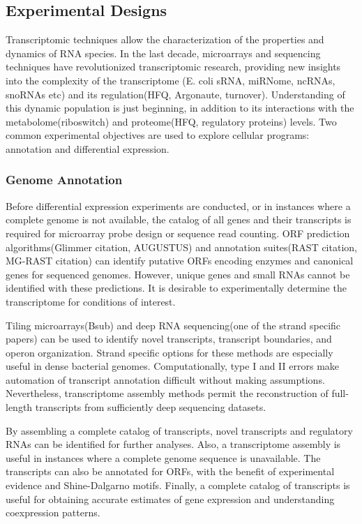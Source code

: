 \subsection{Experimental Designs}
Transcriptomic techniques allow the characterization of the properties and dynamics of RNA species. In the last decade, microarrays and sequencing techniques have revolutionized transcriptomic research, providing new insights into the complexity of the transcriptome (E. coli sRNA, miRNome, ncRNAs, snoRNAs etc) and its regulation(HFQ, Argonaute, turnover). Understanding of this dynamic population is just beginning, in addition to its interactions with the metabolome(riboswitch) and proteome(HFQ, regulatory proteins) levels. Two common experimental objectives are used to explore cellular programs: annotation and differential expression.

\subsubsection{Genome Annotation}
Before differential expression experiments are conducted, or in instances where a complete genome is not available, the catalog of all genes and their transcripts is required for microarray probe design or sequence read counting. ORF prediction algorithms(Glimmer citation, AUGUSTUS) and annotation suites(RAST citation, MG-RAST citation) can identify putative ORFs encoding enzymes and canonical genes for sequenced genomes. However, unique genes and small RNAs cannot be identified with these predictions. It is desirable to experimentally determine the transcriptome for conditions of interest.

Tiling microarrays(Bsub) and deep RNA sequencing(one of the strand specific papers) can be used to identify novel transcripts, transcript boundaries, and operon organization. Strand specific options for these methods are especially useful in dense bacterial genomes. Computationally, type I and II errors make automation of transcript annotation difficult without making assumptions. Nevertheless, transcriptome assembly methods permit the reconstruction of full-length transcripts from sufficiently deep sequencing datasets.

By assembling a complete catalog of transcripts, novel transcripts and regulatory RNAs can be identified for further analyses. Also, a transcriptome assembly is useful in instances where a complete genome sequence is unavailable. The transcripts can also be annotated for ORFs, with the benefit of experimental evidence and Shine-Dalgarno motifs. Finally, a complete catalog of transcripts is useful for obtaining accurate estimates of gene expression and understanding coexpression patterns.

